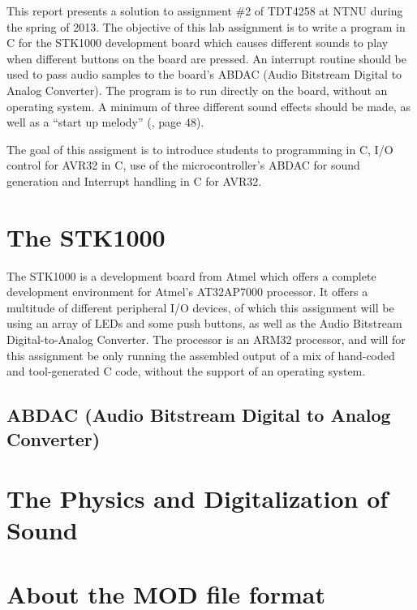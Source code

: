 This report presents a solution to assignment \#2 of TDT4258 at NTNU during the spring of 2013.
The objective of this lab assignment is to write a program in C for the STK1000 development board which causes different sounds to play when different buttons on the board are pressed.
An interrupt routine should be used to pass audio samples to the board's ABDAC (Audio Bitstream Digital to Analog Converter).
The program is to run directly on the board, without an operating system.
A minimum of three different sound effects should be made, as well as a ``start up melody'' (\cite{compendium}, page 48).

The goal of this assigment is to introduce students to programming in C, I/O control for AVR32 in C, use of the microcontroller's ABDAC for sound generation and Interrupt handling in C for AVR32.

\section{The STK1000}
	The STK1000 is a development board from Atmel which offers a complete development environment for Atmel's AT32AP7000 processor.
	It offers a multitude of different peripheral I/O devices, of which this assignment will be using an array of LEDs and some push buttons, as well as the Audio Bitstream Digital-to-Analog Converter.
	The processor is an ARM32 processor, and will for this assignment be only running the assembled output of a mix of hand-coded and tool-generated C code, without the support of an operating system.

	\subsection{ABDAC (Audio Bitstream Digital to Analog Converter)}
		

\section{The Physics and Digitalization of Sound}
	

\section{About the MOD file format}
	
